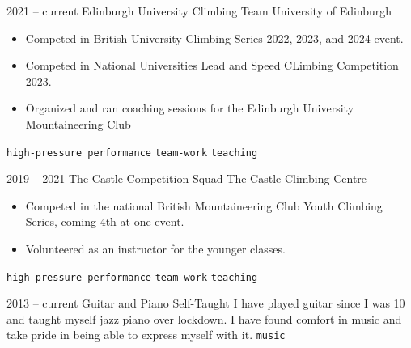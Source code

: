 \documentclass[9pt]{developercv} %
\begin{document}
\vspace{-10 pt}
\begin{entrylist}
	\entry
        {2021 -- current}
		{Edinburgh University Climbing Team}
		{University of Edinburgh}
		{\vspace{-10pt}
        \begin{itemize}[noitemsep,topsep=0pt,parsep=0pt,partopsep=0pt, leftmargin=-1pt]
            \item Competed in British University Climbing Series 2022, 2023, and 2024 event. 
            \item Competed in National Universities Lead and Speed CLimbing Competition 2023. 
            \item Organized and ran coaching sessions for the Edinburgh University Mountaineering Club
        \end{itemize} 
        \texttt{high-pressure performance} \slashsep \texttt{team-work} \slashsep \texttt{teaching}}
	\entry
		{2019 -- 2021}
		{The Castle Competition Squad}
		{The Castle Climbing Centre}
		{\vspace{-10pt}
        \begin{itemize}[noitemsep,topsep=0pt,parsep=0pt,partopsep=0pt, leftmargin=-1pt]
            \item Competed in the national British Mountaineering Club Youth Climbing Series, coming 4th at one event.
            \item Volunteered as an instructor for the younger classes. 
        \end{itemize} 
        \texttt{high-pressure performance} \slashsep \texttt{team-work} \slashsep \texttt{teaching}}
	\entry
		{2013 -- current}
		{Guitar and Piano}
		{Self-Taught}
		{
			I have played guitar since I was 10 and taught myself jazz piano over lockdown. 
			I have found comfort in music and take pride in being able to express myself with it. 
        \newline
		\texttt{music}
		}
\end{entrylist}
\end{document}
